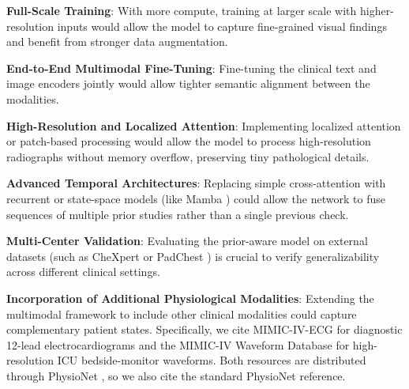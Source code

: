 \textbf{Full-Scale Training}: With more compute, training at larger scale with higher-resolution inputs would allow the model to capture fine-grained visual findings and benefit from stronger data augmentation.

\textbf{End-to-End Multimodal Fine-Tuning}: Fine-tuning the clinical text and image encoders jointly would allow tighter semantic alignment between the modalities.

\textbf{High-Resolution and Localized Attention}: Implementing localized attention or patch-based processing would allow the model to process high-resolution radiographs without memory overflow, preserving tiny pathological details.

\textbf{Advanced Temporal Architectures}: Replacing simple cross-attention with recurrent or state-space models (like Mamba \cite{gu2024mamba}) could allow the network to fuse sequences of multiple prior studies rather than a single previous check.

\textbf{Multi-Center Validation}: Evaluating the prior-aware model on external datasets (such as CheXpert or PadChest \cite{bustos2020padchest}) is crucial to verify generalizability across different clinical settings.

\textbf{Incorporation of Additional Physiological Modalities}: Extending the multimodal framework to include other clinical modalities could capture complementary patient states. Specifically, we cite MIMIC-IV-ECG \cite{gow2023mimiciv_ecg} for diagnostic 12-lead electrocardiograms and the MIMIC-IV Waveform Database \cite{moody2022mimiciv_waveform} for high-resolution ICU bedside-monitor waveforms. Both resources are distributed through PhysioNet \cite{goldberger2000physionet}, so we also cite the standard PhysioNet reference.

